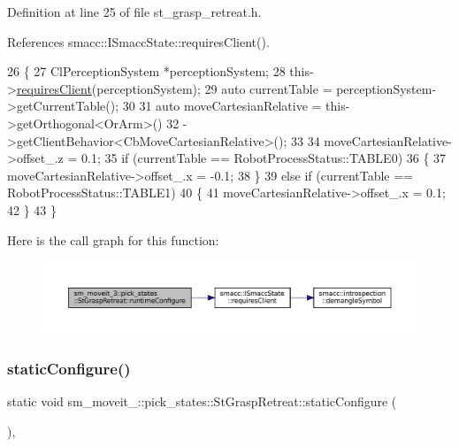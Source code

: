 Definition at line 25 of file st\+\_\+grasp\+\_\+retreat.\+h.



References smacc\+::\+I\+Smacc\+State\+::requires\+Client().


\begin{DoxyCode}
26     \{
27         ClPerceptionSystem *perceptionSystem;
28         this->\hyperlink{classsmacc_1_1ISmaccState_a7f95c9f0a6ea2d6f18d1aec0519de4ac}{requiresClient}(perceptionSystem);
29         \textcolor{keyword}{auto} currentTable = perceptionSystem->getCurrentTable();
30 
31         \textcolor{keyword}{auto} moveCartesianRelative = this->getOrthogonal<OrArm>()
32                                          ->getClientBehavior<CbMoveCartesianRelative>();
33 
34         moveCartesianRelative->offset\_.z = 0.1;
35         \textcolor{keywordflow}{if} (currentTable == RobotProcessStatus::TABLE0)
36         \{
37             moveCartesianRelative->offset\_.x = -0.1;
38         \}
39         \textcolor{keywordflow}{else} \textcolor{keywordflow}{if} (currentTable == RobotProcessStatus::TABLE1)
40         \{
41             moveCartesianRelative->offset\_.x = 0.1;
42         \}
43     \}
\end{DoxyCode}
Here is the call graph for this function\+:
\nopagebreak
\begin{figure}[H]
\begin{center}
\leavevmode
\includegraphics[width=350pt]{structsm__moveit__3_1_1pick__states_1_1StGraspRetreat_aeb2a5f4d14d2af41ff8fff1e1fc711a5_cgraph}
\end{center}
\end{figure}
\mbox{\label{structsm__moveit__3_1_1pick__states_1_1StGraspRetreat_a0a912f3c7c58451efa6ba7a86fb98270}} 
\subsubsection{\texorpdfstring{static\+Configure()}{staticConfigure()}}
{\footnotesize\ttfamily static void sm\+\_\+moveit\+\_\+::pick\+\_\+states\+::\+St\+Grasp\+Retreat\+::static\+Configure (\begin{DoxyParamCaption}{ }\end{DoxyParamCaption})\hspace{0.3cm}{\ttfamily [inline]}, {\ttfamily [static]}}



